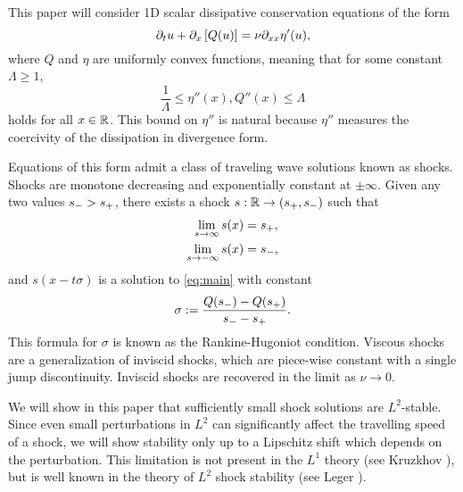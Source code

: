 This paper will consider 1D scalar dissipative conservation equations of the form
\begin{equation} \label{eq:main} 
\partial_t u + \partial_x\left[ Q(u) \right] = \nu \partial_{xx} \eta'(u), 
\end{equation}
where $Q$ and $\eta$ are uniformly convex functions, meaning that for some constant $\Lambda \geq 1$,
\begin{equation} \label{convexity condition}
\frac{1}{\Lambda} \leq \eta''(x), Q''(x) \leq \Lambda
\end{equation}
holds for all $x \in \mathbb{R}$.  This bound on $\eta''$ is natural because $\eta''$ measures the coercivity of the dissipation in divergence form.

Equations of this form admit a class of traveling wave solutions known as shocks.  Shocks are monotone decreasing and exponentially constant at $\pm \infty$.  Given any two values $s_- > s_+$, there exists a shock $s:\mathbb{R} \to (s_+, s_-)$ such that
\begin{align*}
\lim_{s \to \infty} s(x) &= s_+, \\
\lim_{s \to -\infty} s(x) &= s_-,
\end{align*}
and $s(x-t \sigma)$ is a solution to \eqref{eq:main} with constant
\[ \sigma := \frac{Q(s_-) - Q(s_+)}{s_- - s_+}. \]
This formula for $\sigma$ is known as the Rankine-Hugoniot condition.  Viscous shocks are a generalization of inviscid shocks, which are piece-wise constant with a single jump discontinuity.  Inviscid shocks are recovered in the limit as $\nu \to 0$.  

We will show in this paper that sufficiently small shock solutions are $L^2$-stable.  Since even small perturbations in $L^2$ can significantly affect the travelling speed of a shock, we will show stability only up to a Lipschitz shift which depends on the perturbation.  This limitation is not present in the $L^1$ theory (see Kruzkhov \cite{Kr.entropy}), but is well known in the theory of $L^2$ shock stability (see Leger \cite{Le}).  

